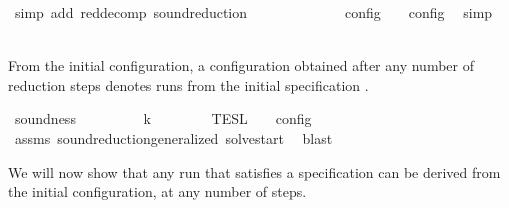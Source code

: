 \begin{isabellebody}
\ {\isacharparenleft}simp\ add{\isacharcolon}\ red{\isacharunderscore}decomp\ sound{\isacharunderscore}reduction{\isacharprime}{\isacharparenright}\isanewline
\ \ \ \ \ \ \ \ \isamarkupfalse%
\ \isamarkupfalse%
\ {\isacartoucheopen}{\isasymlbrakk}\ {\isasymS}\ {\isasymrbrakk}\isactrlsub c\isactrlsub o\isactrlsub n\isactrlsub f\isactrlsub i\isactrlsub g\ {\isasymsupseteq}\ {\isasymlbrakk}\ {\isasymS}\ {\isasymrbrakk}\isactrlsub c\isactrlsub o\isactrlsub n\isactrlsub f\isactrlsub i\isactrlsub g{\isacartoucheclose}\ \isamarkupfalse%
\ simp\isanewline
\ \ \ \ \ \ \isamarkupfalse%
\isanewline
\ \ \isamarkupfalse%
\isanewline
{}\isamarkupfalse%
%
\endisatagproof
{\isafoldproof}%
%
\isadelimproof
%
\endisadelimproof
%
\begin{isamarkuptext}%
From the initial configuration, a configuration \isa{{\isasymS}} obtained after any 
  number  of reduction steps denotes runs from the 
  initial specification \isa{{\isasymPsi}}.%
\end{isamarkuptext}\isamarkuptrue%
\isamarkupfalse%
\ soundness{\isacharcolon}\isanewline
\ \ \ {\isacartoucheopen}{\isacharparenleft}{\isacharbrackleft}{\isacharbrackright}{\isacharcomma}\ {}\ {\isasymturnstile}\ {\isasymPsi}\ {\isasymtriangleright}\ {\isacharbrackleft}{\isacharbrackright}{\isacharparenright}\ {\isasymhookrightarrow}\isactrlbsup k\isactrlesup \ {\isasymS}{\isacartoucheclose}\isanewline
\ \ \ \ \ {\isacartoucheopen}{\isasymlbrakk}{\isasymlbrakk}\ {\isasymPsi}\ {\isasymrbrakk}{\isasymrbrakk}\isactrlsub T\isactrlsub E\isactrlsub S\isactrlsub L\ {\isasymsupseteq}\ {\isasymlbrakk}\ {\isasymS}\ {\isasymrbrakk}\isactrlsub c\isactrlsub o\isactrlsub n\isactrlsub f\isactrlsub i\isactrlsub g{\isacartoucheclose}\isanewline
%
\isadelimproof
\ \ %
\endisadelimproof
%
\isatagproof
{}\isamarkupfalse%
\ assms\ sound{\isacharunderscore}reduction{\isacharunderscore}generalized\ solve{\isacharunderscore}start\ \isamarkupfalse%
\ blast%
\endisatagproof
{\isafoldproof}%
%
\isadelimproof
%
\endisadelimproof
%
\isadelimdocument
%
\endisadelimdocument
%
\isatagdocument
%
\isamarkuptrue%
%
\endisatagdocument
{\isafolddocument}%
%
\isadelimdocument
%
\endisadelimdocument
%
\begin{isamarkuptext}%
We will now show that any run that satisfies a specification can be derived
  from the initial configuration, at any number of steps.


\end{isamarkuptext}
\end{isabellebody}
